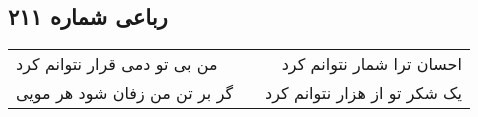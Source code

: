 \begin{center}
\section*{رباعی شماره ۲۱۱}
\label{sec:sh211}
\begin{longtable}{l p{0.5cm} r}
من بی تو دمی قرار نتوانم کرد
&&
احسان ترا شمار نتوانم کرد
\\
گر بر تن من زفان شود هر مویی
&&
یک شکر تو از هزار نتوانم کرد
\\
\end{longtable}
\end{center}
